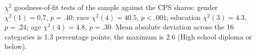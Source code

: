 $\chi^2$ goodness-of-fit tests of the sample against the CPS shares: gender $\chi^2(1)=0.7$, $p=.40$; race $\chi^2(4)=40.5$, $p<.001$; education $\chi^2(3)=4.3$, $p=.24$; age $\chi^2(4)=4.8$, $p=.30$. Mean absolute deviation across the 16 categories is 1.3 percentage points; the maximum is 2.6 (High school diploma or below).
